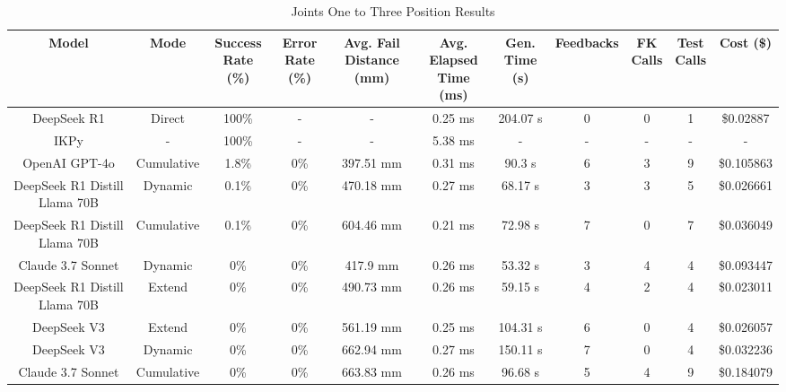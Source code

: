 \begin{landscape}
\begin{table}[H]
\tiny
\renewcommand{\arraystretch}{1.2}
\caption{Joints One to Three Position Results}
\begin{center}
\begin{tabular}{|c|c|c|c|c|c|c|c|c|c|c|}
    \hline
    \textbf{Model} & 
    \textbf{Mode} & 
    \makecell{\textbf{Success}\\\textbf{Rate (\%)}} &
    \makecell{\textbf{Error}\\\textbf{Rate (\%)}} &
    \makecell{\textbf{Avg. Fail}\\\textbf{Distance (mm)}} &
    \makecell{\textbf{Avg. Elapsed}\\\textbf{Time (ms)}} &
    \makecell{\textbf{Gen.}\\\textbf{Time (s)}} &
    \textbf{Feedbacks} &
    \makecell{\textbf{FK}\\\textbf{Calls}} &
    \makecell{\textbf{Test}\\\textbf{Calls}} &
    \textbf{Cost (\$)} \\
    \hline
    DeepSeek R1 & Direct & 100\% & - & - & 0.25 ms & 204.07 s & 0 & 0 & 1 & \$0.02887 \\
    \hline
    IKPy & - & 100\% & - & - & 5.38 ms & - & - & - & - & - \\
    \hline
    OpenAI GPT-4o & Cumulative & 1.8\% & 0\% & 397.51 mm & 0.31 ms & 90.3 s & 6 & 3 & 9 & \$0.105863 \\
    \hline
    DeepSeek R1 Distill Llama 70B & Dynamic & 0.1\% & 0\% & 470.18 mm & 0.27 ms & 68.17 s & 3 & 3 & 5 & \$0.026661 \\
    \hline
    DeepSeek R1 Distill Llama 70B & Cumulative & 0.1\% & 0\% & 604.46 mm & 0.21 ms & 72.98 s & 7 & 0 & 7 & \$0.036049 \\
    \hline
    Claude 3.7 Sonnet & Dynamic & 0\% & 0\% & 417.9 mm & 0.26 ms & 53.32 s & 3 & 4 & 4 & \$0.093447 \\
    \hline
    DeepSeek R1 Distill Llama 70B & Extend & 0\% & 0\% & 490.73 mm & 0.26 ms & 59.15 s & 4 & 2 & 4 & \$0.023011 \\
    \hline
    DeepSeek V3 & Extend & 0\% & 0\% & 561.19 mm & 0.25 ms & 104.31 s & 6 & 0 & 4 & \$0.026057 \\
    \hline
    DeepSeek V3 & Dynamic & 0\% & 0\% & 662.94 mm & 0.27 ms & 150.11 s & 7 & 0 & 4 & \$0.032236 \\
    \hline
    Claude 3.7 Sonnet & Cumulative & 0\% & 0\% & 663.83 mm & 0.26 ms & 96.68 s & 5 & 4 & 9 & \$0.184079 \\
    \hline

\end{tabular}
\end{center}
\end{table}
\end{landscape}

